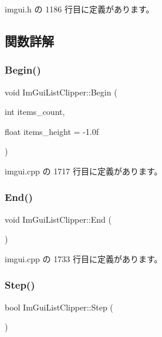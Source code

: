  imgui.\+h の 1186 行目に定義があります。



\subsection{関数詳解}
\mbox{\label{struct_im_gui_list_clipper_a746fbd724a41dbe88fef4875a2b1e9c7}} 
\subsubsection{\texorpdfstring{Begin()}{Begin()}}
{\footnotesize\ttfamily void Im\+Gui\+List\+Clipper\+::\+Begin (\begin{DoxyParamCaption}\item[{int}]{items\+\_\+count,  }\item[{float}]{items\+\_\+height = {\ttfamily -\/1.0f} }\end{DoxyParamCaption})}



 imgui.\+cpp の 1717 行目に定義があります。

\mbox{\label{struct_im_gui_list_clipper_a3e6aec0db317985319a78513fc2c8068}} 
\subsubsection{\texorpdfstring{End()}{End()}}
{\footnotesize\ttfamily void Im\+Gui\+List\+Clipper\+::\+End (\begin{DoxyParamCaption}{ }\end{DoxyParamCaption})}



 imgui.\+cpp の 1733 行目に定義があります。

\mbox{\label{struct_im_gui_list_clipper_ac3e115812c3c4e5a39578a7aa955379a}} 
\subsubsection{\texorpdfstring{Step()}{Step()}}
{\footnotesize\ttfamily bool Im\+Gui\+List\+Clipper\+::\+Step (\begin{DoxyParamCaption}{ }\end{DoxyParamCaption})}



